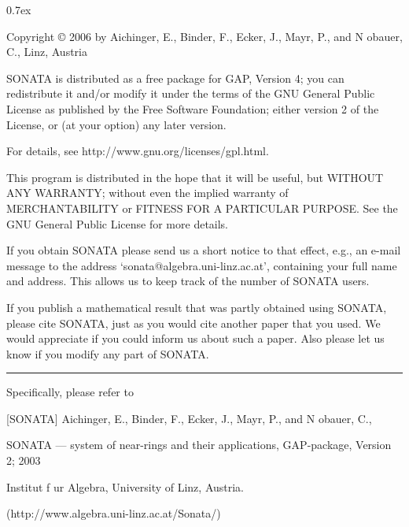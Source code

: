 


\begingroup
\def\"#1{\accent127 #1}
\parindent 0pt
\parskip 0.7ex

{\everypar{\hangindent\manindent}
Copyright {\copyright} 2006 by\hfill\break
Aichinger, E., Binder, F., Ecker, J., Mayr, P., and N{\"o}bauer, C.,\hfill{} Linz, Austria}

\medskip

 SONATA  is  distributed as a free package for GAP, Version 4;
 you can redistribute it and/or
 modify it under the terms of the GNU General Public License
 as published by the Free Software Foundation;
 either version 2 of the License, or (at your option) any later version.

 For details, see http://www.gnu.org/licenses/gpl.html.

 This program is distributed in the hope that it will be useful,
 but WITHOUT ANY WARRANTY; without even the implied warranty of
 MERCHANTABILITY or FITNESS FOR A PARTICULAR PURPOSE.  See the
 GNU General Public License for more details.

 If you obtain SONATA please send us  a short notice to that effect,
 e.g., an  e-mail  message   to  the  address
 `sonata@algebra.uni-linz.ac.at',
 containing your full  name and address. 
 This  allows us to keep track of the number of SONATA users.

 If you  publish  a mathematical  result  that  was  partly obtained using
 SONATA, please cite SONATA, just as you would cite another paper that you
 used.\* We would appreciate if you could inform us  about such a paper.
 Also please let us know if you  modify any part of SONATA.


\vfill\hrule

\noindent\llap{\*\enspace}Specifically, please refer to

\smallskip \parindent4pc \parskip 0pt
\item{[SONATA]}
Aichinger, E., Binder, F., Ecker, J., Mayr, P., and N{\"o}bauer, C.,
\item{} SONATA --- system of near-rings and their applications, GAP-package, Version 2;
2003
\item{} Institut f\"ur Algebra, University of Linz, Austria.
\item{} (http://www.algebra.uni-linz.ac.at/Sonata/)
\endgroup


